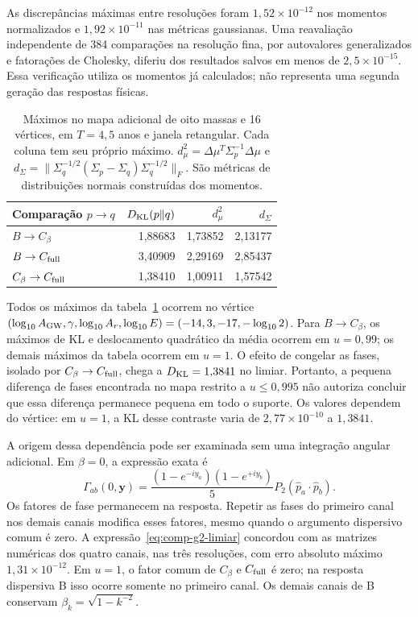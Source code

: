 As discrepâncias máximas entre resoluções foram
$1{,}52\times10^{-12}$ nos momentos normalizados e
$1{,}92\times10^{-11}$ nas métricas gaussianas.
Uma reavaliação independente de 384 comparações na resolução fina,
por autovalores generalizados e fatorações de Cholesky, diferiu dos
resultados salvos em menos de $2{,}5\times10^{-15}$.
Essa verificação utiliza os momentos já calculados; não representa
uma segunda geração das respostas físicas.

\begin{table}[htbp]
\centering
\caption{Máximos no mapa adicional de oito massas e 16 vértices, em
$T=4{,}5$ anos e janela retangular. Cada coluna tem seu próprio máximo.
$d_\mu^2=\Delta\mu^T\Sigma_p^{-1}\Delta\mu$ e
$d_\Sigma=\|\Sigma_q^{-1/2}(\Sigma_p-\Sigma_q)\Sigma_q^{-1/2}\|_F$.
São métricas de distribuições normais construídas dos momentos.}
\label{tab:comp-g2-maximos}
\begin{tabular}{lrrr}
\toprule
Comparação $p\to q$ & $D_{\rm KL}(p\Vert q)$ & $d_\mu^2$ & $d_\Sigma$ \\
\midrule
$B\to C_\beta$ & 1,88683 & 1,73852 & 2,13177 \\
$B\to C_{\rm full}$ & 3,40909 & 2,29169 & 2,85437 \\
$C_\beta\to C_{\rm full}$ & 1,38410 & 1,00911 & 1,57542 \\
\bottomrule
\end{tabular}
\end{table}

Todos os máximos da tabela~\ref{tab:comp-g2-maximos} ocorrem no vértice
$(\log_{10}A_{\rm GW},\gamma,\log_{10}A_r,\log_{10}E)
=(-14,3,-17,-\log_{10}2)$.
Para $B\to C_\beta$, os máximos de KL e deslocamento quadrático da média
ocorrem em $u=0{,}99$; os demais máximos da tabela ocorrem em $u=1$.
O efeito de congelar as fases, isolado por $C_\beta\to C_{\rm full}$,
chega a $D_{\rm KL}=1{,}3841$ no limiar. Portanto, a pequena diferença
de fases encontrada no mapa restrito a $u\leq0{,}995$ não autoriza
concluir que essa diferença permanece pequena em todo o suporte.
Os valores dependem do vértice: em $u=1$, a KL desse contraste varia
de $2{,}77\times10^{-10}$ a $1{,}3841$.

A origem dessa dependência pode ser examinada sem uma integração angular
adicional. Em $\beta=0$, a expressão exata é
\begin{equation}
 \Gamma_{ab}(0,\boldsymbol y)
 =\frac{(1-e^{-iy_a})(1-e^{+iy_b})}{5}
 P_2(\hat p_a\cdot\hat p_b).
 \label{eq:comp-g2-limiar}
\end{equation}
Os fatores de fase permanecem na resposta. Repetir as fases do primeiro
canal nos demais canais modifica esses fatores, mesmo quando o argumento
dispersivo comum é zero. A expressão~\eqref{eq:comp-g2-limiar} concordou
com as matrizes numéricas dos quatro canais, nas três resoluções, com erro
absoluto máximo $1{,}31\times10^{-12}$.
Em $u=1$, o fator comum de $C_\beta$ e $C_{\rm full}$ é zero;
na resposta dispersiva B isso ocorre somente no primeiro canal.
Os demais canais de B conservam $\beta_k=\sqrt{1-k^{-2}}$.

